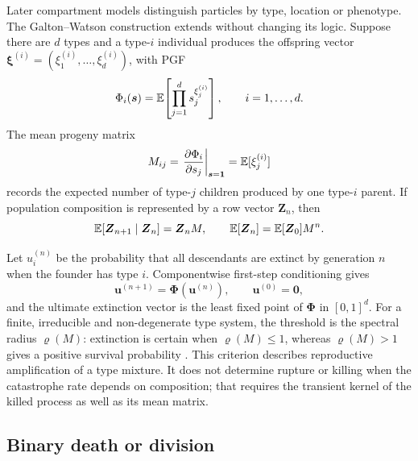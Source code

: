 Later compartment models distinguish particles by type, location or phenotype.
The Galton--Watson construction extends without changing its logic.  Suppose
there are \(d\) types and a type-\(i\) individual produces the offspring vector
\(\boldsymbol\xi^{(i)}=(\xi^{(i)}_1,\ldots,\xi^{(i)}_d)\), with PGF
\begin{equation}
  \Phi_i(\boldsymbol s)
  =\mathbb{E}\!\left[\prod_{j=1}^{d}s_j^{\xi^{(i)}_j}\right],
  \qquad i=1,\ldots,d.
  \label{eq:multitype-offspring-pgf}
\end{equation}
The mean progeny matrix
\begin{equation}
  M_{ij}
  =\left.\frac{\partial\Phi_i}{\partial s_j}\right|_{\boldsymbol s=\boldsymbol1}
  =\mathbb{E}[\xi^{(i)}_j]
  \label{eq:mean-progeny-matrix}
\end{equation}
records the expected number of type-\(j\) children produced by one type-\(i\)
parent.  If population composition is represented by a row vector
\(\boldsymbol Z_n\), then
\begin{equation}
  \mathbb{E}[\boldsymbol Z_{n+1}\mid\boldsymbol Z_n]
  =\boldsymbol Z_nM,
  \qquad
  \mathbb{E}[\boldsymbol Z_n]=\mathbb{E}[\boldsymbol Z_0]M^n.
  \label{eq:multitype-mean}
\end{equation}

Let \(u_i^{(n)}\) be the probability that all descendants are extinct by
generation \(n\) when the founder has type \(i\).  Componentwise first-step
conditioning gives
\begin{equation}
  \boldsymbol u^{(n+1)}
  =\boldsymbol\Phi(\boldsymbol u^{(n)}),
  \qquad
  \boldsymbol u^{(0)}=\boldsymbol0,
  \label{eq:multitype-extinction-iteration}
\end{equation}
and the ultimate extinction vector is the least fixed point of
\(\boldsymbol\Phi\) in \([0,1]^d\).  For a finite, irreducible and
non-degenerate type system, the threshold is the spectral radius
\(\varrho(M)\): extinction is certain when \(\varrho(M)\leq1\), whereas
\(\varrho(M)>1\) gives a positive survival probability
\cite{Athreya1972}.  This criterion describes reproductive amplification of a
type mixture.  It does not determine rupture or killing when the catastrophe
rate depends on composition; that requires the transient kernel of the killed
process as well as its mean matrix.

\subsection{Binary death or division}
\label{sec:deathordivision}

